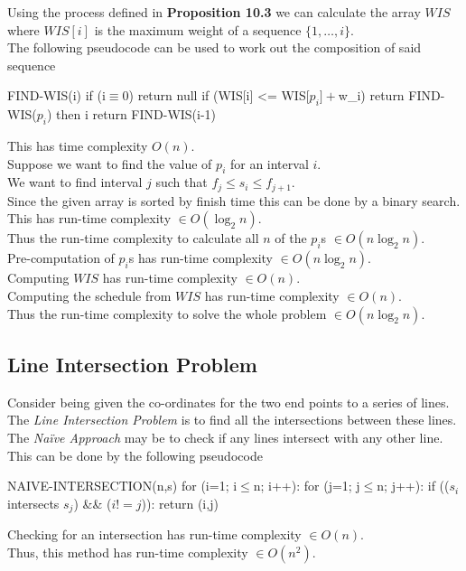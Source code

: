 \documentclass[11pt,a4paper]{article}
\begin{document}
Using the process defined in \textbf{Proposition 10.3} we can calculate the array $WIS$ where $WIS[i]$ is the maximum weight of a sequence $\{1,\dots,i\}$.\\
The following pseudocode can be used to work out the composition of said sequence
\begin{code}
FIND-WIS(i)
if (i$\equiv$0)
  return null
if (WIS[i] <= WIS[$p_i]+$w_i)
  return FIND-WIS($p_i$) then i
return FIND-WIS(i-1)
\end{code}
\nb This has time complexity $O(n)$.\\

Suppose we want to find the value of $p_i$ for an interval $i$.\\
We want to find interval $j$ such that $f_j\leq s_i\leq f_{j+1}$.\\
Since the given array is sorted by finish time this can be done by a binary search.\\
This has run-time complexity $\in O(\log_2n)$.\\
Thus the run-time complexity to calculate all $n$ of the $p_i$s $\in O(n\log_2n)$.\\

Pre-computation of $p_i$s has run-time complexity $\in O(n\log_2n)$.\\
Computing $WIS$ has run-time complexity $\in O(n)$.\\
Computing the schedule from $WIS$ has run-time complexity $\in O(n)$.\\
Thus the run-time complexity to solve the whole problem $\in O(n\log_2n)$.

\subsection{Line Intersection Problem}

Consider being given the co-ordinates for the two end points to a series of lines.\\
The \textit{Line Intersection Problem} is to find all the intersections between these lines.\\

The \textit{Na\"ive Approach} may be to check if any lines intersect with any other line.\\
This can be done by the following pseudocode
\begin{code}
NAIVE-INTERSECTION(n,s)
for (i=1; i$\leq$n; i++):
  for (j=1; j$\leq$n; j++):
    if (($s_i$ intersects $s_j$) && ($i!=j$)):
      return (i,j)
\end{code}
Checking for an intersection has run-time complexity $\in O(n)$.\\
Thus, this method has run-time complexity $\in O(n^2)$.\\
\end{document}
